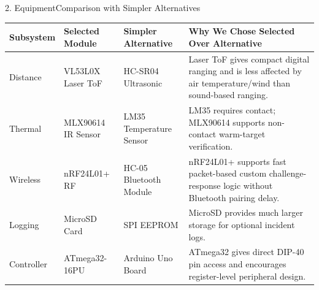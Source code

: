 \documentclass[aspectratio=169, 10pt]{beamer}
\begin{document}
\begin{frame}{2. Equipment}{Comparison with Simpler Alternatives}
    \tiny
    \begin{table}
        \centering
        \begin{tabular}{p{1.8cm} p{2.35cm} p{2.45cm} p{4.1cm}}
            \toprule
            \textbf{\color{Accent} Subsystem} & \textbf{\color{Accent} Selected Module} & \textbf{\color{Accent} Simpler Alternative} & \textbf{\color{Accent} Why We Chose Selected Over Alternative} \\
            \midrule
            Distance & VL53L0X Laser ToF & HC-SR04 Ultrasonic & Laser ToF gives compact digital ranging and is less affected by air temperature/wind than sound-based ranging. \\
            Thermal & MLX90614 IR Sensor & LM35 Temperature Sensor & LM35 requires contact; MLX90614 supports non-contact warm-target verification. \\
            Wireless & nRF24L01+ RF & HC-05 Bluetooth Module & nRF24L01+ supports fast packet-based custom challenge-response logic without Bluetooth pairing delay. \\
            Logging & MicroSD Card & SPI EEPROM & MicroSD provides much larger storage for optional incident logs. \\
            Controller & ATmega32-16PU & Arduino Uno Board & ATmega32 gives direct DIP-40 pin access and encourages register-level peripheral design. \\
            \bottomrule
        \end{tabular}
    \end{table}
\end{frame}
\end{document}
